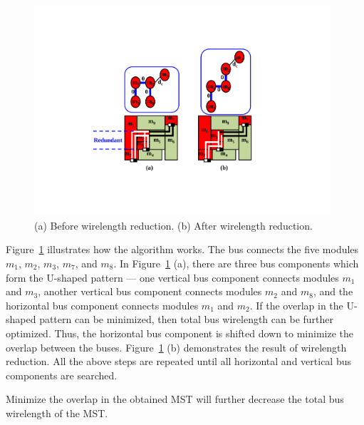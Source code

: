 \begin{figure}[htb]
  \centering
    \includegraphics[width=11cm]{Fig/overlap_minimization.pdf}
     \caption{
      \small
       (a) Before wirelength reduction. (b) After wirelength reduction.
   }
  \label{fig::overlap_minimization}
\end{figure}

Figure~\ref{fig::overlap_minimization} illustrates how
the algorithm works. The bus connects the five modules $m_1$,
$m_2$, $m_3$, $m_7$, and $m_8$. In Figure~\ref{fig::overlap_minimization} (a),
there are three bus components which form the U-shaped pattern --- one vertical bus component
connects modules $m_1$ and $m_3$, another vertical bus component connects
modules $m_2$ and $m_8$, and the horizontal bus component connects modules
$m_1$ and $m_2$. If the overlap in the U-shaped pattern can be minimized, then
total bus wirelength can be further optimized.
Thus, the horizontal bus component is shifted down to minimize the overlap between the buses.
Figure~\ref{fig::overlap_minimization} (b) demonstrates the
result of wirelength reduction. All the above steps are repeated until all horizontal and vertical
bus components are searched.

\begin{Lemma}
Minimize the overlap in the obtained MST will further decrease the
total bus wirelength of the MST.
\end{Lemma}

